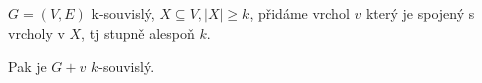 \documentclass[../main.tex]{subfiles}
\begin{document}
\begin{lemma}
    $G=(V,E)$ k-souvislý, $X\subseteq V , |X|\geq k$, přidáme vrchol $v$ který je spojený s vrcholy v $X$, tj stupně alespoň $k$.

    Pak je $G+v$ $k$-souvislý.
\end{lemma}
\end{document}
